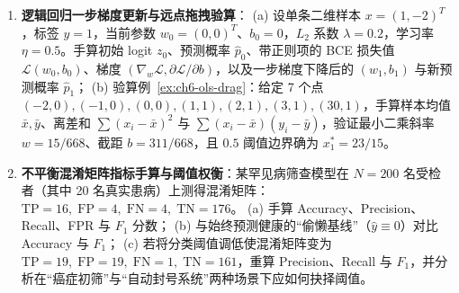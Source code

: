 \begin{enumerate}[label=\textbf{6.\arabic*}, resume]
  \item \textbf{逻辑回归一步梯度更新与远点拖拽验算}：
  (a) 设单条二维样本 $x = (1, -2)^T$，标签 $y = 1$，当前参数 $w_0 = (0, 0)^T$、$b_0 = 0$，$L_2$ 系数 $\lambda = 0.2$，学习率 $\eta = 0.5$。手算初始 logit $z_0$、预测概率 $\hat{p}_0$、带正则项的 BCE 损失值 $\mathcal{L}(w_0, b_0)$、梯度 $(\nabla_w \mathcal{L}, \partial\mathcal{L}/\partial b)$，以及一步梯度下降后的 $(w_1, b_1)$ 与新预测概率 $\hat{p}_1$；
  (b) 验算例~\ref{ex:ch6-ols-drag}：给定 7 个点 $(-2,0), (-1,0), (0,0), (1,1), (2,1), (3,1), (30,1)$，手算样本均值 $\bar{x}, \bar{y}$、离差和 $\sum (x_i - \bar{x})^2$ 与 $\sum (x_i-\bar{x})(y_i-\bar{y})$，验证最小二乘斜率 $w = 15/668$、截距 $b = 311/668$，且 $0.5$ 阈值边界确为 $x_1^* = 23/15$。

  \item \textbf{不平衡混淆矩阵指标手算与阈值权衡}：某罕见病筛查模型在 $N=200$ 名受检者（其中 20 名真实患病）上测得混淆矩阵：$\mathrm{TP}=16,\; \mathrm{FP}=4,\; \mathrm{FN}=4,\; \mathrm{TN}=176$。
  (a) 手算 Accuracy、Precision、Recall、FPR 与 $F_1$ 分数；
  (b) 与始终预测健康的“偷懒基线”（$\hat{y}\equiv 0$）对比 Accuracy 与 $F_1$；
  (c) 若将分类阈值调低使混淆矩阵变为 $\mathrm{TP}=19,\; \mathrm{FP}=19,\; \mathrm{FN}=1,\; \mathrm{TN}=161$，重算 Precision、Recall 与 $F_1$，并分析在“癌症初筛”与“自动封号系统”两种场景下应如何抉择阈值。
\end{enumerate}

